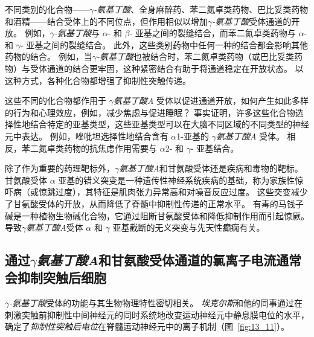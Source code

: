 不同类别的化合物——\textit{$\gamma$-氨基丁酸}、全身麻醉药、苯二氮卓类药物、巴比妥类药物和酒精——结合受体上的不同位点，但作用相似以增加\textit{$\gamma$-氨基丁酸}受体通道的开放。
例如，\textit{$\gamma$-氨基丁酸}与 $\alpha$- 和 $\beta$- 亚基之间的裂缝结合，而苯二氮卓类药物与 $\alpha$- 和 $\gamma$- 亚基之间的裂缝结合。
此外，这些类别药物中任何一种的结合都会影响其他药物的结合。
例如，当\textit{$\gamma$-氨基丁酸}也被结合时，苯二氮卓类药物（或巴比妥类药物）与受体通道的结合更牢固，这种紧密结合有助于将通道稳定在开放状态。
以这种方式，各种化合物都增强了抑制性突触传递。


这些不同的化合物都作用于 \textit{$\gamma$氨基丁酸A} 受体以促进通道开放，如何产生如此多样的行为和心理效应，例如，减少焦虑与促进睡眠？
事实证明，许多这些化合物选择性地结合特定的亚基类型，这些亚基类型可以在大脑不同区域的不同类型的神经元中表达。
例如，唑吡坦选择性地结合含有 $\alpha$1-亚基的 \textit{$\gamma$氨基丁酸A} 受体。
相反，苯二氮卓类药物的抗焦虑作用需要与 $\alpha$2- 和 $\gamma$- 亚基结合。


除了作为重要的药理靶标外，\textit{$\gamma$氨基丁酸A}和甘氨酸受体还是疾病和毒物的靶标。
甘氨酸受体 $\alpha$ 亚基的错义突变是一种遗传性神经系统疾病的基础，称为家族性惊吓病（或惊跳过度），其特征是肌肉张力异常高和对噪音反应过度。
这些突变减少了甘氨酸受体的开放，从而降低了脊髓中抑制性传递的正常水平。
有毒的马钱子碱是一种植物生物碱化合物，它通过阻断甘氨酸受体和降低抑制作用而引起惊厥。
导致\textit{$\gamma$氨基丁酸A}受体 $\alpha$ 和 $\gamma$ 亚基截断的无义突变与先天性癫痫有关。



\subsection{通过\textit{$\gamma$氨基丁酸A}和甘氨酸受体通道的氯离子电流通常会抑制突触后细胞}

\textit{$\gamma$-氨基丁酸}受体的功能与其生物物理特性密切相关。
\textit{埃克尔斯}和他的同事通过在刺激突触前抑制性中间神经元的同时系统地改变运动神经元中静息膜电位的水平，确定了\textit{抑制性突触后电位}在脊髓运动神经元中的离子机制（图~\ref{fig:13_11}）。


